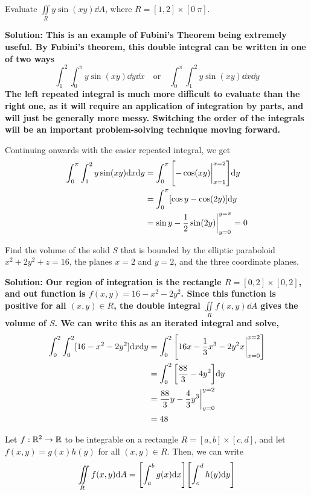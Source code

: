\begin{example}
    Evaluate \( \iint\limits_Ry\sin(xy)\dd A \), where \( R=[1, 2]\times[0\ \pi] \).\par\bf{Solution: }This is an example of Fubini's Theorem being extremely useful. By Fubini's theorem, this double integral can be written in one of two ways
    \[ \int_1^2\int_0^\pi y\sin(xy)\dd y \dd x\quad\text{or}\quad\int_0^\pi\int_1^2y\sin(xy)\dd x\dd y\]
    The left repeated integral is much more difficult to evaluate than the right one, as it will require an application of integration by parts, and will just be generally more messy. Switching the order of the integrals will be an important problem-solving technique moving forward. \par
    Continuing onwards with the easier repeated integral, we get
    \begin{align*}
        \int_0^\pi\int_1^2y\sin(xy)\dd x\dd y &= \int_0^\pi \bqty{-\cos(xy)\biggr|_{x=1}^{x=2}}\dd y \\
        &= \int_0^\pi [\cos y-\cos(2y)]\dd y \\
        &= \sin y - \frac{1}{2}\sin(2y)\biggr|_{y=0}^{y=\pi} =  0
    \end{align*}
\end{example}
\begin{example}
    Find the volume of the solid \( S \) that is bounded by the elliptic paraboloid \( x^2+2y^2+z=16 \), the planes \( x=2 \) and \( y=2 \), and the three coordinate planes.\par
    \bf{Solution: }Our region of integration is the rectangle \( R = [0, 2]\times[0, 2] \), and out function is \( f(x, y) = 16-x^2-2y^2 \). Since this function is positive for all \( (x,y)\in R \), the double integral \( \iint\limits_Rf(x,y)\dd A \) gives the volume of \( S \). We can write this as an iterated integral and solve,
    \begin{align*}
        \int_0^2\int_0^2[16-x^2-2y^2]\dd x\dd y &= \int_0^2\bqty{16x-\frac{1}{3}x^3-2y^2x\biggr|_{x=0}^{x=2}}\\ &= \int_0^2\bqty{\frac{88}{3} - 4y^2}\dd y \\
        &= \frac{88}{3}y - \frac{4}{3}y^3\biggr|_{y=0}^{y=2} \\
        &= 48
    \end{align*}
\end{example}
\begin{theorem}
    Let \( f: \mathbb{R}^2\to \mathbb{R} \) to be integrable on a rectangle \( R = [a, b]\times[c, d] \), and let \( f(x,y) = g(x)h(y) \) for all \( (x,y)\in R \). Then, we can write
\[ \iint\limits_Rf(x,y)\dd A = \bqty{\int_a^bg(x)\dd x}\bqty{\int_c^dh(y)\dd y}\]
\end{theorem}
